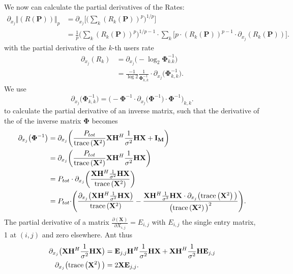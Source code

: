 We now can calculate the partial derivatives of the Rates:
\begin{align}
	\partial_{x_j} \bigr\Vert{(R(\mathbf{P}))\bigl\Vert}_p
	&=\partial_{x_j}\Biggr[\Biggr(\sum_k{(R_k(\mathbf{P}))^p}\Biggl)^{1/p}\Biggl]\\
	&=\frac{1}{p}\Biggr(\sum_k{(R_k(\mathbf{P}))^p}\Biggl)^{1/p-1} \cdot \sum_k{\Biggr[p\cdot(R_k(\mathbf{P}))^{p-1} \cdot \partial_{x_j}(R_k(\mathbf{P}))\Biggl]}.
\end{align}
with the partial derivative of the $k$-th users rate
\begin{align}
	\partial_{x_j}(R_k) &= \partial_{x_j}\bigr(-\log_2{\mathbf{\Phi}_{k.k}^{-1}}\bigl)\\
	&=\frac{-1}{\log{2}}\frac{1}{\mathbf{\Phi}_{k,k}^{-1}} \cdot \partial_{x_j}\bigr(\mathbf{\Phi}_{k,k}^{-1}\bigl).
\end{align}
We use
\begin{equation}
	\partial_{x_j}\bigr(\mathbf{\Phi}_{k,k}^{-1}\bigl) = \Biggr(-\mathbf{\Phi}^{-1} \cdot \partial_{x_j}\bigr(\mathbf{\Phi}^{-1}\bigl) \cdot \mathbf{\Phi}^{-1}\Biggl)_{k,k}.
\end{equation} to calculate the partial derivative of an inverse matrix, such that the derivative of the of the inverse matrix $\mathbf{\Phi}$ becomes
\begin{align}
	\partial_{x_j}\bigr(\mathbf{\Phi}^{-1}\bigl) &= \partial_{x_j} \biggr(\frac{P_{tot}}{\text{trace}\left(\mathbf{X}^2\right)} \mathbf{X}\mathbf{H}^H\frac{1}{\sigma^2}\mathbf{H} \mathbf{X} + \mathbf{I_M} \biggl)\\
	&= \partial_{x_j} \biggr(\frac{P_{tot}}{\text{trace}\left(\mathbf{X}^2\right)} \mathbf{X}\mathbf{H}^H\frac{1}{\sigma^2}\mathbf{H} \mathbf{X}\biggl)\\
	&= P_{tot} \cdot \partial_{x_j} \biggr(\frac{ \mathbf{X}\mathbf{H}^H\frac{1}{\sigma^2}\mathbf{H} \mathbf{X} }{\text{trace}\left(\mathbf{X}^2\right)}\biggl)\\
	&= P_{tot} \cdot \Biggr(\frac{\partial_{x_j}\bigr(\mathbf{X}\mathbf{H}^H\frac{1}{\sigma^2}\mathbf{H}\mathbf{X}\bigl)}{\text{trace}\left(\mathbf{X}^2\right)} - \frac{\mathbf{X}\mathbf{H}^H\frac{1}{\sigma^2}\mathbf{H}\mathbf{X} \cdot \partial_{x_j}\bigr(\text{trace}\left(\mathbf{X}^2\right)\bigl)}{\bigr(\text{trace}\left(\mathbf{X}^2\right)\bigl)^2}\Biggl).
\end{align}
The partial derivative of a matrix $\frac{\partial(\mathbf{X})}{\partial X_{i,j}} = E_{i,j}$ with $E_{i,j}$ the single entry matrix, 1 at $(i,j)$ and zero elsewhere. Ant thus
\begin{align}
	\partial_{x_j}\bigr(\mathbf{X}\mathbf{H}^H\frac{1}{\sigma^2}\mathbf{H}\mathbf{X}\bigl) &= \mathbf{E}_{j,j}\mathbf{H}^H\frac{1}{\sigma^2}\mathbf{HX} + \mathbf{XH}^H\frac{1}{\sigma^2}\mathbf{HE}_{j,j}\\
	\partial_{x_j}\bigr(\text{trace}\left(\mathbf{X}^2\right)\bigl) &= 2\mathbf{XE}_{j,j}.
\end{align}
